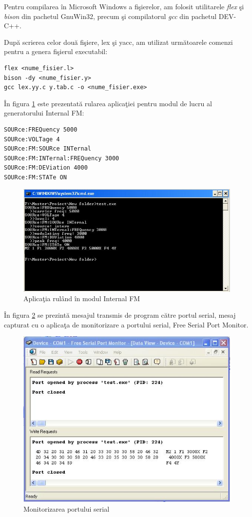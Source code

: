 Pentru compilarea \^{i}n Microsoft Windows a fi\c{s}ierelor, am folosit utilitarele \emph{flex} \c{s}i \emph{bison} din pachetul GnuWin32, precum \c{s}i compilatorul \emph{gcc} din pachetul DEV-C++.

Dup\u{a} scrierea celor dou\u{a} fi\c{s}iere, lex \c{s}i yacc, am utilizat urm\u{a}toarele comenzi pentru a genera fi\c{s}ierul executabil:
\begin{verbatim}
flex <nume_fisier.l>
bison -dy <nume_fisier.y>
gcc lex.yy.c y.tab.c -o <nume_fisier.exe>
\end{verbatim}

\^{I}n figura \ref{fig_cmd} este prezentat\u{a} rularea aplica\c{t}iei pentru modul de lucru al generatorului Internal FM:
\begin{verbatim}
SOURce:FREQuency 5000
SOURce:VOLTage 4
SOURce:FM:SOURce INTernal
SOURce:FM:INTernal:FREQuency 3000
SOURce:FM:DEViation 4000
SOURce:FM:STATe ON
\end{verbatim}
\begin{figure}[htp]
 \centering
 \includegraphics[scale=0.5]{Figuri/cmd_run.JPG}
 \caption{Aplica\c{t}ia rul\^{a}nd \^{i}n modul Internal FM}
 \label{fig_cmd}
\end{figure}

\^{I}n figura \ref{fig_mon} se prezint\u{a} mesajul transmis de program c\u{a}tre portul serial, mesaj capturat cu o aplica\c{t}a de monitorizare a portului serial, Free Serial Port Monitor.
\begin{figure}[htp]
 \centering
 \includegraphics[scale=0.5]{Figuri/com_monitor.JPG}
 \caption{Monitorizarea portului serial}
 \label{fig_mon}
\end{figure}

